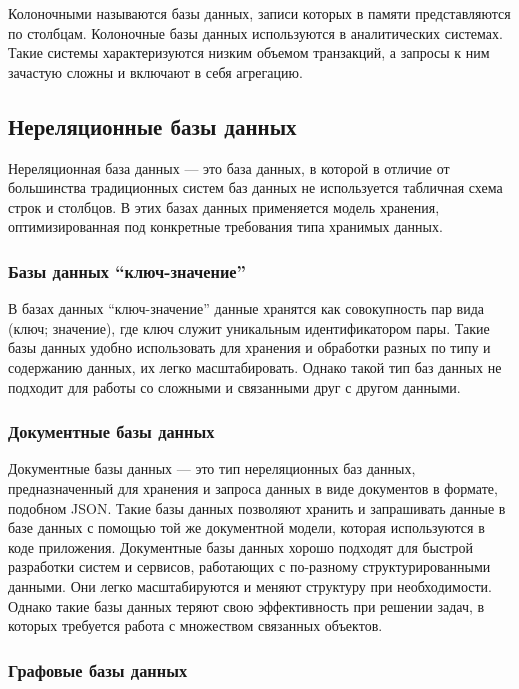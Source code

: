 Колоночными называются базы данных, записи которых в памяти представляются по столбцам. Колоночные базы данных используются в аналитических системах. Такие системы характеризуются низким объемом транзакций, а запросы к ним зачастую сложны и включают в себя агрегацию.

\subsection*{Нереляционные базы данных}

Нереляционная база данных --- это база данных, в которой в отличие от большинства традиционных систем баз данных не используется табличная схема строк и столбцов. В этих базах данных применяется модель хранения, оптимизированная под конкретные требования типа хранимых данных.

\subsubsection{Базы данных \enquote{ключ-значение}}

В базах данных \enquote{ключ-значение} данные хранятся как совокупность пар вида (ключ; значение), где ключ служит уникальным идентификатором пары. Такие базы данных удобно использовать для хранения и обработки разных по типу и содержанию данных, их легко масштабировать. Однако такой тип баз данных не подходит для работы со сложными и связанными друг с другом данными.

\subsubsection{Документные базы данных}

Документные базы данных --- это тип нереляционных баз данных, предназначенный для хранения и запроса данных в виде документов в формате, подобном JSON. Такие базы данных позволяют хранить и запрашивать данные в базе данных с помощью той же документной модели, которая используются в коде приложения. Документные базы данных хорошо подходят для быстрой разработки систем и сервисов, работающих с по-разному структурированными данными. Они легко масштабируются и меняют структуру при необходимости. Однако такие базы данных теряют свою эффективность при решении задач, в которых требуется работа с множеством связанных объектов.

\subsubsection{Графовые базы данных}

